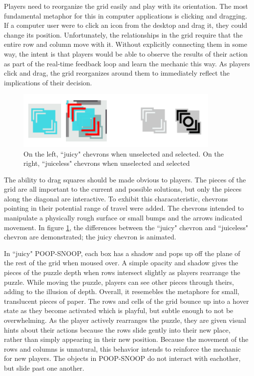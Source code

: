 Players need to reorganize the grid easily and play with its orientation. The most fundamental metaphor for this in computer applications is clicking and dragging. If a computer user were to click an icon from the desktop and drag it, they could change its position. Unfortunately, the relationships in the grid require that the entire row and column move with it. Without explicitly connecting them in some way, the intent is that players would be able to observe the results of their action as part of the real-time feedback loop and learn the mechanic this way. As players click and drag, the grid reorganizes around them to immediately reflect the implications of their decision.

\begin{figure}
\begin{center}
\includegraphics[width=100mm]{images/chevron.pdf}
\caption{On the left, ``juicy" chevrons when unselected and selected. On the right, ``juiceless" chevrons when unselected and selected}
\label{fig:chevrons}
\end{center}
\end{figure}

The ability to drag squares should be made obvious to players. The pieces of the grid are all important to the current and possible solutions, but only the pieces along the diagonal are interactive. To exhibit this characateristic, chevrons pointing in their potential range of travel were added. The chevrons intended to manipulate a physically rough surface or small bumps and the arrows indicated movement. In figure \ref{fig:chevrons}, the differences between the ``juicy" chevron and ``juiceless" chevron are demonstrated; the juicy chevron is animated.

In ``juicy" POOP-SNOOP, each box has a shadow and pops up off the plane of the rest of the grid when moused over. A simple opacity and shadow gives the pieces of the puzzle depth when rows intersect slightly as players rearrange the puzzle. While moving the puzzle, players can see other pieces through theirs, adding to the illusion of depth. Overall, it resemebles the metaphore for small, translucent pieces of paper. The rows and cells of the grid bounce up into a hover state as they become activated which is playful, but subtle enough to not be overwhelming. As the player actively rearranges the puzzle, they are given visual hints about their actions because the rows slide gently into their new place, rather than simply appearing in their new position. Because the movement of the rows and columns is unnatural, this behavior intends to reinforce the mechanic for new players. The objects in POOP-SNOOP do not interact with eachother, but slide past one another.

